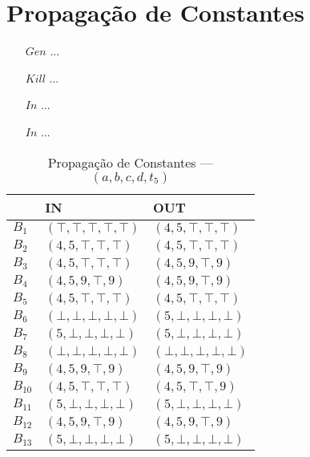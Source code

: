 \section{Propaga\c{c}\~ao de Constantes}

\begin{itemize}
  \item[$Gen$] ...
  \item[$Kill$] ...
  \item[$In$] ...
  \item[$In$] ...
\end{itemize}

\begin{table}[ht]
\centering
\begin{tabular}{l|l|l}
	& IN & OUT\\
\hline
$B_{1}$ &  $(\top,\top,\top,\top,\top)$ & $(4,5,\top,\top,\top)$\\
$B_{2}$ &  $(4,5,\top,\top,\top)$ & $(4,5,\top,\top,\top)$\\
$B_{3}$ &  $(4,5,\top,\top,\top)$ & $(4,5,9,\top,9)$\\
$B_{4}$ &  $(4,5,9,\top,9)$ & $(4,5,9,\top,9)$\\
$B_{5}$ &  $(4,5,\top,\top,\top)$ & $(4,5,\top,\top,\top)$\\
$B_{6}$ &  $(\bot,\bot,\bot,\bot,\bot)$ & $(5,\bot,\bot,\bot,\bot)$\\
$B_{7}$ &  $(5,\bot,\bot,\bot,\bot)$ & $(5,\bot,\bot,\bot,\bot)$\\
$B_{8}$ &  $(\bot,\bot,\bot,\bot,\bot)$ & $(\bot,\bot,\bot,\bot,\bot)$\\
$B_{9}$ &  $(4,5,9,\top,9)$ & $(4,5,9,\top,9)$\\
$B_{10}$ &  $(4,5,\top,\top,\top)$ & $(4,5,\top,\top,9)$\\
$B_{11}$ &  $(5,\bot,\bot,\bot,\bot)$ & $(5,\bot,\bot,\bot,\bot)$\\
$B_{12}$ &  $(4,5,9,\top,9)$ & $(4,5,9,\top,9)$\\
$B_{13}$ &  $(5,\bot,\bot,\bot,\bot)$ & $(5,\bot,\bot,\bot,\bot)$\\
\end{tabular}
\caption{Propaga\c{c}\~ao de Constantes --- $(a, b, c, d, t_{5})$}
\end{table}

